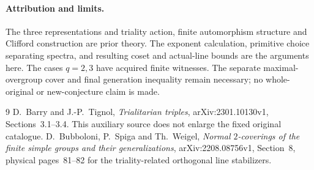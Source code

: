 \documentclass[11pt,a4paper]{article}
\begin{document}
\paragraph{Attribution and limits.}
The three representations and triality action, finite automorphism
structure and Clifford construction are prior theory. The exponent
calculation, primitive choice separating spectra, and resulting
coset and actual-line bounds are the arguments here.
The cases $q=2,3$ have acquired finite witnesses.
The separate maximal-overgroup cover and final generation inequality
remain necessary; no whole-original or new-conjecture claim is made.

\begin{thebibliography}{9}\small
{} D.~Barry and J.-P.~Tignol, \emph{Trialitarian triples},
arXiv:2301.10130v1, Sections~3.1--3.4.
This auxiliary source does not enlarge the fixed original catalogue.
 D.~Bubboloni, P.~Spiga and Th.~Weigel,
\emph{Normal $2$-coverings of the finite simple groups and their
generalizations}, arXiv:2208.08756v1, Section~8, physical pages~81--82
for the triality-related orthogonal line stabilizers.
\end{thebibliography}
\end{document}
